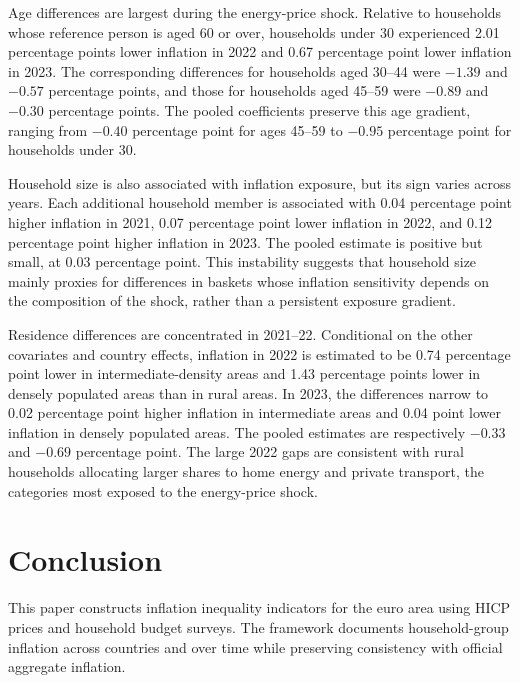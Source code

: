 \documentclass[11pt]{article}
\begin{document}
Age differences are largest during the energy-price shock. Relative to households whose reference
person is aged 60 or over, households under 30 experienced 2.01 percentage points lower inflation in
2022 and 0.67 percentage point lower inflation in 2023. The corresponding differences for households
aged 30--44 were $-1.39$ and $-0.57$ percentage points, and those for households aged 45--59 were
$-0.89$ and $-0.30$ percentage points. The pooled coefficients preserve this age gradient, ranging
from $-0.40$ percentage point for ages 45--59 to $-0.95$ percentage point for households under 30.

Household size is also associated with inflation exposure, but its sign varies across years. Each
additional household member is associated with 0.04 percentage point higher inflation in 2021,
0.07 percentage point lower inflation in 2022, and 0.12 percentage point higher inflation in 2023.
The pooled estimate is positive but small, at 0.03 percentage point. This instability suggests that
household size mainly proxies for differences in baskets whose inflation sensitivity depends on the
composition of the shock, rather than a persistent exposure gradient.

Residence differences are concentrated in 2021--22. Conditional on the other covariates and country
effects, inflation in 2022 is estimated to be 0.74 percentage point lower in intermediate-density
areas and 1.43 percentage points lower in densely populated areas than in rural areas. In 2023, the
differences narrow to 0.02 percentage point higher inflation in intermediate areas and 0.04 point
lower inflation in densely populated areas. The pooled estimates are respectively $-0.33$ and
$-0.69$ percentage point. The large 2022 gaps are consistent with rural households allocating larger
shares to home energy and private transport, the categories most exposed to the energy-price shock.

\section{Conclusion}



This paper constructs inflation inequality indicators for the euro area using HICP prices and
household budget surveys. The framework documents household-group inflation across countries and
over time while preserving consistency with official aggregate inflation.
\end{document}
